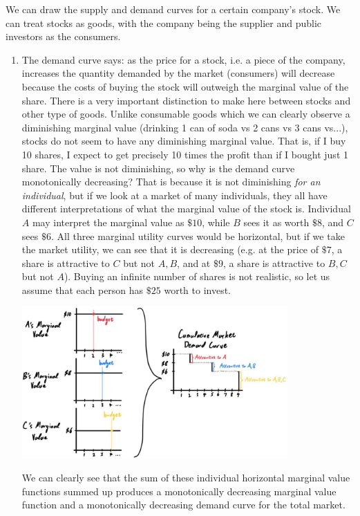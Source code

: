 \documentclass{article}
\begin{document}
    We can draw the supply and demand curves for a certain company's stock. We can treat stocks as goods, with the company being the supplier and public investors as the consumers. 
    \begin{enumerate}
      \item The demand curve says: as the price for a stock, i.e. a piece of the company, increases the quantity demanded by the market (consumers) will decrease because the costs of buying the stock will outweigh the marginal value of the share. There is a very important distinction to make here between stocks and other type of goods. Unlike consumable goods which we can clearly observe a diminishing marginal value (drinking 1 can of soda vs 2 cans vs 3 cans vs...), stocks do not seem to have any diminishing marginal value. That is, if I buy 10 shares, I expect to get precisely 10 times the profit than if I bought just 1 share. The value is not diminishing, so why is the demand curve monotonically decreasing? That is because it is not diminishing \textit{for an individual}, but if we look at a market of many individuals, they all have different interpretations of what the marginal value of the stock is. Individual $A$ may interpret the marginal value as $\$10$, while $B$ sees it as worth $\$8$, and $C$ sees $\$6$. All three marginal utility curves would be horizontal, but if we take the market utility, we can see that it is decreasing (e.g. at the price of $\$7$, a share is attractive to $C$ but not $A, B$, and at $\$9$, a share is attractive to $B, C$ but not $A$). Buying an infinite number of shares is not realistic, so let us assume that each person has $\$25$ worth to invest. 
      \begin{center}
        \includegraphics[width=0.8\textwidth]{img/Stock_demand_curve.jpg}
      \end{center}
      We can clearly see that the sum of these individual horizontal marginal value functions summed up produces a monotonically decreasing marginal value function and a monotonically decreasing demand curve for the total market. 


\end{enumerate}
\end{document}
